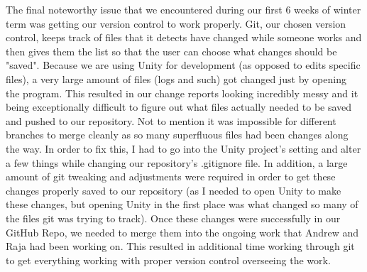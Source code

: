 \documentclass[onecolumn, draftclsnofoot,10pt, compsoc]{IEEEtran}
\begin{document}
The final noteworthy issue that we encountered during our first 6 weeks of winter term was getting our version control to work properly.  Git, our chosen version control, keeps track of files that it detects have changed while someone works and then gives them the list so that the user can choose what changes should be "saved".  Because we are using Unity for development (as opposed to edits specific files), a very large amount of files (logs and such) got changed just by opening the program.  This resulted in our change reports looking incredibly messy and it being exceptionally difficult to figure out what files actually needed to be saved and pushed to our repository.  Not to mention it was impossible for different branches to merge cleanly as so many superfluous files had been changes along the way.  In order to fix this, I had to go into the Unity project's setting and alter a few things while changing our repository's .gitignore file.  In addition, a large amount of git tweaking and adjustments were required in order to get these changes properly saved to our repository (as I needed to open Unity to make these changes, but opening Unity in the first place was what changed so many of the files git was trying to track).  Once these changes were successfully in our GitHub Repo, we needed to merge them into the ongoing work that Andrew and Raja had been working on.  This resulted in additional time working through git to get everything working with proper version control overseeing the work.
\end{document}
